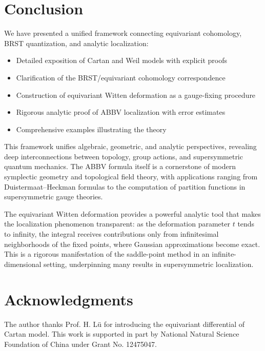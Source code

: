 \documentclass[10pt]{article}
\theoremstyle{definition}
\begin{document}
\section{Conclusion}\label{sec:conclusion}
We have presented a unified framework connecting equivariant cohomology, BRST quantization, and analytic localization:
\begin{itemize}
    \item Detailed exposition of Cartan and Weil models with explicit proofs
    \item Clarification of the BRST/equivariant cohomology correspondence
    \item Construction of equivariant Witten deformation as a gauge-fixing procedure
    \item Rigorous analytic proof of ABBV localization with error estimates
    \item Comprehensive examples illustrating the theory
\end{itemize}

This framework unifies algebraic, geometric, and analytic perspectives, revealing deep interconnections between topology, group actions, and supersymmetric quantum mechanics. The ABBV formula itself is a cornerstone of modern symplectic geometry and topological field theory, with applications ranging from Duistermaat--Heckman formulas to the computation of partition functions in supersymmetric gauge theories.

The equivariant Witten deformation provides a powerful analytic tool that makes the localization phenomenon transparent: as the deformation parameter $t$ tends to infinity, the integral receives contributions only from infinitesimal neighborhoods of the fixed points, where Gaussian approximations become exact. This is a rigorous manifestation of the saddle-point method in an infinite-dimensional setting, underpinning many results in supersymmetric localization.

\section{Acknowledgments}
The author thanks Prof. H. L\"u for introducing the equivariant differential of Cartan model. This work is supported in part by National Natural Science Foundation of China under Grant No. 12475047.




%
%
\end{document}
